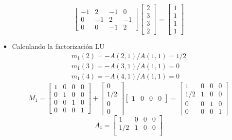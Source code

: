 \begin{itemize}
\[\begin{bmatrix}
    		-1 & 2 & -1 & 0 \\
    		0 & -1 & 2 & -1 \\
    		0 & 0 & -1 & 2  
  			\end{bmatrix}
  			\begin{bmatrix}
    		2 \\
    		3 \\
    		3 \\
    		2   
  			\end{bmatrix}
  			=
  			\begin{bmatrix}
    		1 \\
    		1 \\
    		1  \\
    		1   
  			\end{bmatrix}
			\]
		\item Calculando la factorización LU 
		  	\begin {equation*} \begin {split}  	
				m_{1}(2) = -A(2,1)/A(1,1) = 1/2 \\
				m_{1}(3) = -A(3,1)/A(1,1) = 0 \\
				m_{1}(4) = -A(4,1)/A(1,1) = 0  
  			\end {split} \end {equation*}
			\[ M_{1} = 
  			\begin{bmatrix}
   			 1 & 0 & 0 & 0 \\ 
    		 0 & 1 & 0 & 0 \\
    		 0 & 0 & 1 & 0 \\
    		 0 & 0 & 0 & 1  
  			\end{bmatrix}
  			+
  			\begin{bmatrix}
   			 0 \\ 
    		 1/2 \\
    		 0 \\
    		 0  
  			\end{bmatrix}
  			\begin{bmatrix}
   			 1 & 0 & 0 & 0 
  			\end{bmatrix}
  			=
  			\begin{bmatrix}
   			 1 & 0 & 0 & 0 \\ 
    		 1/2 & 1 & 0 & 0 \\
    		 0 & 0 & 1 & 0 \\
    		 0 & 0 & 0 & 1  
  			\end{bmatrix}
  			\]	
  			\[ A_{1} = 
  			\begin{bmatrix}
   			 1 & 0 & 0 & 0 \\ 
    		 1/2 & 1 & 0 & 0 \\

\end{bmatrix}\]
\end{itemize}
